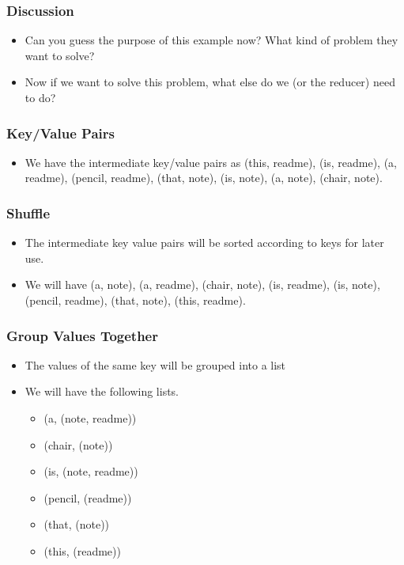 \documentclass{beamer}
\begin{document}
\begin{frame}
  \frametitle{Discussion}
  \begin{itemize}
    \item Can you guess the purpose of this example now? What kind of
      problem they want to solve?
    \item Now if we want to solve this problem, what else do we (or
      the reducer) need to do?
  \end{itemize}
\end{frame}

\begin{frame}
  \frametitle{Key/Value Pairs}
  \begin{itemize}
    \item We have the intermediate key/value pairs as (this,
      readme), (is, readme), (a, readme), (pencil, readme), (that,
      note), (is, note), (a, note), (chair, note).
  \end{itemize}
\end{frame}

\begin{frame}
  \frametitle{Shuffle}
  \begin{itemize}
    \item The intermediate key value pairs will be sorted according to
      keys for later use.
    \item We will have (a, note), (a, readme), (chair, note), (is,
      readme), (is, note), (pencil, readme), (that, note), (this,
      readme).
  \end{itemize}
\end{frame}

\begin{frame}
  \frametitle{Group Values Together}
  \begin{itemize}
    \item The values of the same key will be grouped into a list
    \item We will have the following lists.
      \begin{itemize}
        \item (a, (note, readme))
        \item (chair, (note))
        \item (is, (note, readme))
        \item (pencil, (readme))
        \item (that, (note))
        \item (this, (readme))
      \end{itemize}
  \end{itemize}
\end{frame}
\end{document}
